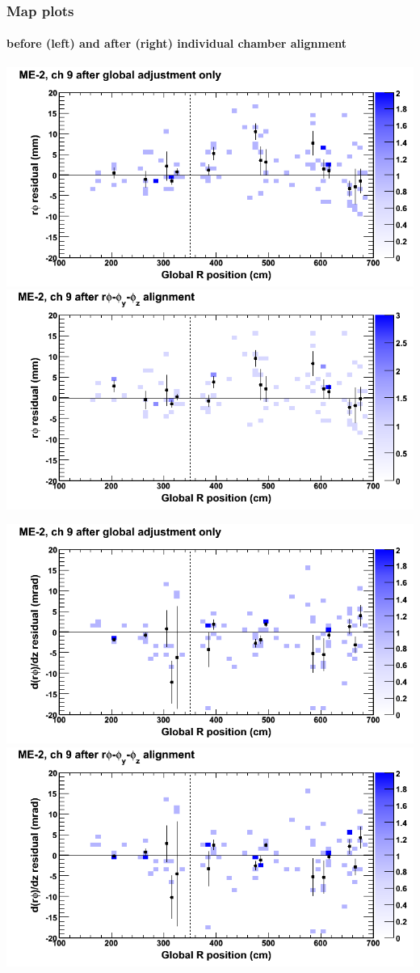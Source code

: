 \documentclass[compress]{beamer}
\begin{document}
\begin{frame}
\frametitle{Map plots}
\framesubtitle{before (left) and after (right) individual chamber alignment}
\includegraphics[width=0.5\linewidth]{ringmapplots_3dof/before_CSCvsr_mem2ch09_x.png} \includegraphics[width=0.5\linewidth]{ringmapplots_3dof/after_CSCvsr_mem2ch09_x.png}

\includegraphics[width=0.5\linewidth]{ringmapplots_3dof/before_CSCvsr_mem2ch09_dxdz.png} \includegraphics[width=0.5\linewidth]{ringmapplots_3dof/after_CSCvsr_mem2ch09_dxdz.png}
\end{frame}
\end{document}
